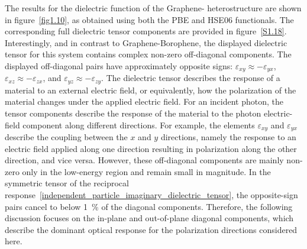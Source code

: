 The results for the dielectric function of the Graphene- heterostructure are shown in figure~\ref{fig1.10},
as obtained using both the PBE and HSE06 functionals.
The corresponding full dielectric tensor components are provided in figure~\ref{S1.18}.
Interestingly, and in contrast to Graphene-Borophene,
the displayed dielectric tensor for this system contains complex non-zero off-diagonal components.
The displayed off-diagonal pairs have approximately opposite signs:
$\varepsilon_{xy}\approx-\varepsilon_{yx}$,
$\varepsilon_{xz}\approx-\varepsilon_{zx}$,
and $\varepsilon_{yz}\approx-\varepsilon_{zy}$.
The dielectric tensor describes the response of a material to an external electric field,
or equivalently, how the polarization of the material changes under the applied electric field.
For an incident photon,
the tensor components describe the response of the material to the photon electric-field component along different directions.
For example, the elements $\varepsilon_{xy}$ and $\varepsilon_{yx}$ describe the coupling between the $x$ and $y$ directions,
namely the response to an electric field applied along one direction resulting in polarization along the other direction, and vice versa.
However, these off-diagonal components are mainly non-zero only in the low-energy region and remain small in magnitude.
In the symmetric tensor of the reciprocal response~\eqref{independent_particle_imaginary_dielectric_tensor}, the opposite-sign pairs cancel to below \qty{1}{\percent} of the diagonal components.
Therefore, the following discussion focuses on the in-plane and out-of-plane diagonal components,
which describe the dominant optical response for the polarization directions considered here.

